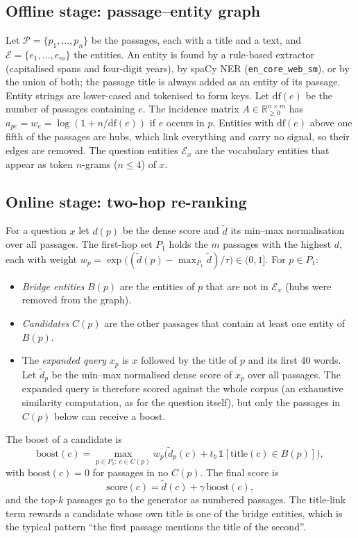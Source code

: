 \documentclass[a4paper,fleqn]{cas-sc}
\begin{document}
\subsection{Offline stage: passage--entity graph}
Let $\mathcal{P}=\{p_1,\dots,p_n\}$ be the passages, each with a title and a text, and $\mathcal{E}=\{e_1,\dots,e_m\}$ the entities. An entity is found by a rule-based extractor (capitalised spans and four-digit years), by spaCy NER (\texttt{en\_core\_web\_sm}), or by the union of both; the passage title is always added as an entity of its passage. Entity strings are lower-cased and tokenised to form keys. Let $\mathrm{df}(e)$ be the number of passages containing $e$. The incidence matrix $A\in\mathbb{R}_{\ge0}^{n\times m}$ has $a_{pe}=w_e=\log(1+n/\mathrm{df}(e))$ if $e$ occurs in $p$. Entities with $\mathrm{df}(e)$ above one fifth of the passages are hubs, which link everything and carry no signal, so their edges are removed. The question entities $\mathcal{E}_x$ are the vocabulary entities that appear as token $n$-grams ($n\le4$) of $x$.

\subsection{Online stage: two-hop re-ranking}
For a question $x$ let $d(p)$ be the dense score and $\widetilde d$ its min--max normalisation over all passages. The first-hop set $P_1$ holds the $m$ passages with the highest $d$, each with weight $w_p=\exp\big((\widetilde d(p)-\max_{P_1}\widetilde d)/\tau\big)\in(0,1]$. For $p\in P_1$:
\begin{itemize}\setlength\itemsep{0pt}
\item \emph{Bridge entities} $B(p)$ are the entities of $p$ that are not in $\mathcal{E}_x$ (hubs were removed from the graph).
\item \emph{Candidates} $C(p)$ are the other passages that contain at least one entity of $B(p)$.
\item The \emph{expanded query} $x_p$ is $x$ followed by the title of $p$ and its first 40 words. Let $\widetilde d_p$ be the min--max normalised dense score of $x_p$ over all passages. The expanded query is therefore scored against the whole corpus (an exhaustive similarity computation, as for the question itself), but only the passages in $C(p)$ below can receive a boost.
\end{itemize}
The boost of a candidate is
\begin{equation}
\mathrm{boost}(c)=\max_{p\in P_1:\,c\in C(p)} w_p\big(\widetilde d_p(c)+t_b\,\mathbb{1}[\mathrm{title}(c)\in B(p)]\big),
\label{eq:boost}
\end{equation}
with $\mathrm{boost}(c)=0$ for passages in no $C(p)$. The final score is
\begin{equation}
\mathrm{score}(c)=\widetilde d(c)+\gamma\,\mathrm{boost}(c),
\label{eq:final}
\end{equation}
and the top-$k$ passages go to the generator as numbered passages. The title-link term rewards a candidate whose own title is one of the bridge entities, which is the typical pattern ``the first passage mentions the title of the second''.
\end{document}
